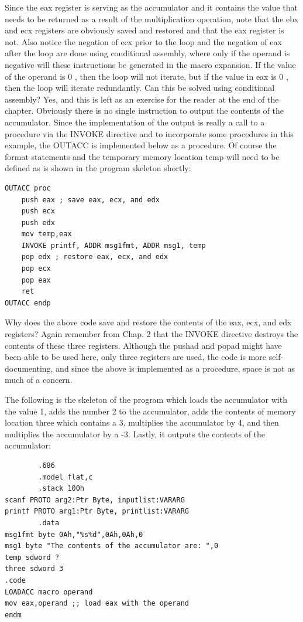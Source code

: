\documentclass[10pt]{book}
\begin{document}
Since the eax register is serving as the accumulator and it contains the value that needs to be returned as a result of the multiplication operation, note that the ebx and ecx registers are obviously saved and restored and that the eax register is not. Also notice the negation of ecx prior to the loop and the negation of eax after the loop are done using conditional assembly, where only if the operand is negative will these instructions be generated in the macro expansion. If the value of the operand is 0 , then the loop will not iterate, but if the value in eax is 0 , then the loop will iterate redundantly. Can this be solved using conditional assembly? Yes, and this is left as an exercise for the reader at the end of the chapter.
Obviously there is no single instruction to output the contents of the accumulator. Since the implementation of the output is really a call to a procedure via the INVOKE directive and to incorporate some procedures in this example, the OUTACC is implemented below as a procedure. Of course the format statements and the temporary memory location temp will need to be defined as is shown in the program skeleton shortly:

\begin{verbatim}
OUTACC proc
    push eax ; save eax, ecx, and edx
    push ecx
    push edx
    mov temp,eax
    INVOKE printf, ADDR msg1fmt, ADDR msg1, temp
    pop edx ; restore eax, ecx, and edx
    pop ecx
    pop eax
    ret
OUTACC endp
\end{verbatim}

Why does the above code save and restore the contents of the eax, ecx, and edx registers? Again remember from Chap. 2 that the INVOKE directive destroys the contents of these three registers. Although the pushad and popad might have been able to be used here, only three registers are used, the code is more self-documenting, and since the above is implemented as a procedure, space is not as much of a concern.

The following is the skeleton of the program which loads the accumulator with the value 1, adds the number 2 to the accumulator, adds the contents of memory location three which contains a 3, multiplies the accumulator by 4, and then multiplies the accumulator by a -3. Lastly, it outputs the contents of the accumulator:

\begin{verbatim}
        .686
        .model flat,c
        .stack 100h
scanf PROTO arg2:Ptr Byte, inputlist:VARARG
printf PROTO arg1:Ptr Byte, printlist:VARARG
        .data
msg1fmt byte 0Ah,"%s%d",0Ah,0Ah,0
msg1 byte "The contents of the accumulator are: ",0
temp sdword ?
three sdword 3
.code
LOADACC macro operand
mov eax,operand ;; load eax with the operand
endm
\end{verbatim}
\end{document}
